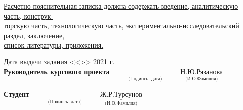 \documentclass[a4paper, 10pt]{article}
\begin{document}
\begin{titlepage}
	\underline{Расчетно-пояснительная записка должна содержать введение, аналитическую часть, конструк-} \\ \underline{торскую часть, технологическую часть, экспериментально-исследовательский раздел, заключение,} \\ \underline{список литературы, приложения. \hspace*{10.5cm}}
		
	\begin{flushleft}
		\small Дата выдачи задания <<\underline{\hspace{1cm}}>> \underline{\hspace{3cm}} 2021 г.
		\newline
		\\ \small \textbf{Руководитель курсового проекта}
		\small \hspace{3cm}$\underset{\text{(Подипсь, дата)}}{\underline{\hspace{4cm}}}$ 
		\small \hspace{4mm}$\underset{\text{(И.О.Фамилия)}}{\underline{\text{Н.Ю.Рязанова}}}$ 
	\end{flushleft}
	\begin{flushleft}
		\small \textbf{Студент}
		\small \hspace{7.2cm}$\underset{\text{(Подипсь, дата)}}{\underline{\hspace{4cm}}}$ 
		\small \hspace{5mm}$\underset{\text{(И.О.Фамилия)}}{\underline{\text{Ж.Р.Турсунов}}}$ 
	\end{flushleft}
	
\end{titlepage}
\end{document}
